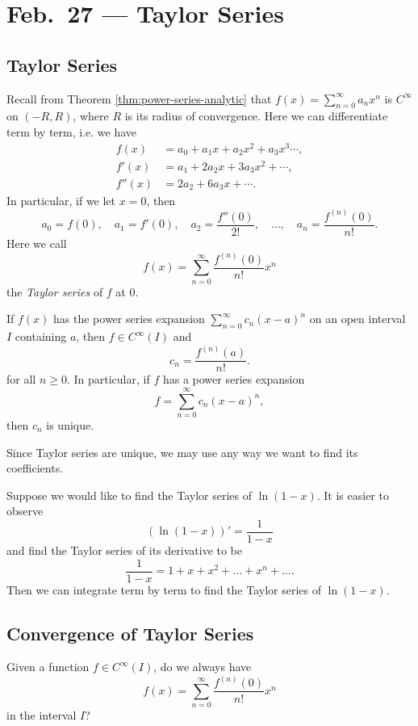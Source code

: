 \chapter{Feb.~27 --- Taylor Series}

\section{Taylor Series}

Recall from Theorem \ref{thm:power-series-analytic} that $f(x) = \sum_{n = 0}^\infty a_n x^n$
is $C^\infty$ on $(-R, R)$, where $R$ is its radius
of convergence. Here we can differentiate term by term,
i.e. we have
\begin{align*}
  f(x) &= a_0 + a_1 x + a_2 x^2 + a_3 x^3 \cdots, \\
  f'(x) &= a_1 + 2a_2 x + 3a_3 x^2 + \cdots, \\
  f''(x) &= 2a_2 + 6a_3 x + \cdots.
\end{align*}
In particular, if we let $x = 0$, then
\[a_0 = f(0), \quad a_1 = f'(0), \quad a_2 = \frac{f''(0)}{2!}, \quad \dots, \quad a_n = \frac{f^{(n)}(0)}{n!}.\]
Here we call
\[
  f(x) = \sum_{n = 0}^\infty \frac{f^{(n)}(0)}{n!} x^n
\]
the \emph{Taylor series} of $f$ at $0$.

\begin{corollary}
  If $f(x)$ has the power series expansion
  $\sum_{n = 0}^\infty c_n (x - a)^n$ on an open interval
  $I$ containing $a$, then $f \in C^\infty(I)$ and
  \[
    c_n = \frac{f^{(n)}(a)}{n!}.
  \]
  for all $n \ge 0$. In particular, if $f$ has a power
  series expansion
  \[
    f = \sum_{n = 0}^\infty c_n (x - a)^n,
  \]
  then $c_n$ is unique.
\end{corollary}

\begin{remark}
  Since Taylor series are unique, we may use any
  way we want to find its coefficients.
\end{remark}

\begin{example}
  Suppose we would like to find the Taylor series of
  $\ln(1 - x)$. It is easier to observe
  \[
    (\ln(1 - x))' = \frac{1}{1 - x}
  \]
  and find the Taylor series of its derivative to be
  \[
    \frac{1}{1 - x} = 1 + x + x^2 + \dots + x^n + \dots.
  \]
  Then we can integrate term by term to find
  the Taylor series of $\ln(1 - x)$.
\end{example}

\section{Convergence of Taylor Series}
Given a function $f \in C^\infty(I)$, do we always have
\[
  f(x) = \sum_{n = 0}^\infty \frac{f^{(n)}(0)}{n!} x^n
\]
in the interval $I$?

